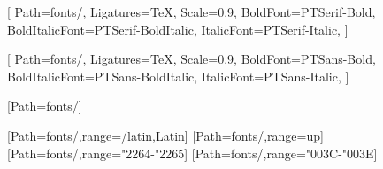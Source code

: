 \usepackage{enumitem, amsmath, amssymb, tikz, fancyhdr, stackengine, sectsty, pdfpages}
\usepackage{lscape,longtable,amsmath,tabularx}
\usepackage{graphicx}

\usepackage[top=18mm, inner=10mm, outer=9mm, bottom=17mm, headheight=14.5pt, headsep=3mm, footskip=7mm]{geometry}

\usepackage[english, russian]{babel}

\usepackage{fontspec}


\setmainfont{PTSerif-Regular}[
  Path=fonts/, Ligatures={TeX}, Scale=0.9,
  BoldFont={PTSerif-Bold},
  BoldItalicFont={PTSerif-BoldItalic},
  ItalicFont={PTSerif-Italic},
]

\setsansfont{PTSans-Regular}[
  Path=fonts/, Ligatures={TeX}, Scale=0.9,
  BoldFont={PTSans-Bold},
  BoldItalicFont={PTSans-BoldItalic},
  ItalicFont={PTSans-Italic},
]

\setmonofont{consola}[Path=fonts/]

\usepackage{unicode-math}
[Path=fonts/,range=\mathit/{latin,Latin}]
[Path=fonts/,range=up]
[Path=fonts/,range="2264-"2265]
[Path=fonts/,range="003C-"003E]

\allsectionsfont{\sffamily}

\usetikzlibrary{arrows.meta}

\usepackage{verbatim}
\usepackage{import}


\newcommand{\problemsname}{Задачи}
\newcommand{\solutionsname}{Решения}
\newcommand{\inputname}{Формат входных данных}
\newcommand{\outputname}{Формат выходных данных}
\newcommand{\examplename}{Пример входного и выходного файлов}
\newcommand{\examplesname}{Примеры входного и выходного файлов}
\newcommand{\commentsname}{Комментарии}
\newcommand{\evaluationname}{Описание системы оценивания}
\newcommand{\InputFileName}{input.txt}
\newcommand{\OutputFileName}{output.txt}
\makeatletter
\def\kw@Explanation{Пояснение к примеру}
\def\kw@Explanations{Пояснения к примерам}

